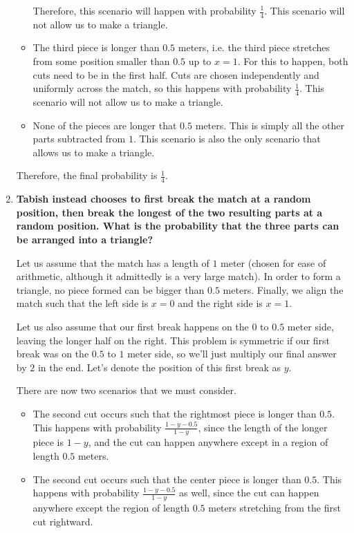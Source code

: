 \documentclass{article}
\begin{document}
\begin{enumerate}[label=(\alph*)]
\begin{itemize}
        Therefore, this scenario will happen with probability $\frac{1}{4}$. This scenario will not allow us to make a triangle.
        
        \item The third piece is longer than $0.5$ meters, i.e. the third piece stretches from some position smaller than $0.5$ up to $x = 1$. For this to happen, both cuts need to be in the first half. Cuts are chosen independently and uniformly across the match, so this happens with probability $\frac{1}{4}$. This scenario will not allow us to make a triangle.
        \item None of the pieces are longer that $0.5$ meters. This is simply all the other parts subtracted from $1$. This scenario is also the only scenario that allows us to make a triangle.
    \end{itemize}
    
    Therefore, the final probability is $\boxed{\frac{1}{4}}$.

    \vspace{2cm}
    
    \item \textbf{Tabish instead chooses to first break the match at a random position, then break the longest of the two resulting parts at a random position. What is the probability that the three parts can be arranged into a triangle?}
    
    Let us assume that the match has a length of $1$ meter (chosen for ease of arithmetic, although it admittedly is a very large match). In order to form a triangle, no piece formed can be bigger than $0.5$ meters. Finally, we align the match such that the left side is $x = 0$ and the right side is $x = 1$.
    
    Let us also assume that our first break happens on the $0$ to $0.5$ meter side, leaving the longer half on the right. This problem is symmetric if our first break was on the $0.5$ to $1$ meter side, so we'll just multiply our final answer by $2$ in the end. Let's denote the position of this first break as $y$.
    
    There are now two scenarios that we must consider.
    
    \begin{itemize}
        \item The second cut occurs such that the rightmost piece is longer than $0.5$. This happens with probability $\frac{1 - y - 0.5}{1 - y}$, since the length of the longer piece is $1 - y$, and the cut can happen anywhere except in a region of length $0.5$ meters.
        \item The second cut occurs such that the center piece is longer than $0.5$. This happens with probability $\frac{1 - y - 0.5}{1 - y}$ as well, since the cut can happen anywhere except the region of length $0.5$ meters stretching from the first cut rightward.
    \end{itemize}
    

\end{enumerate}
\end{document}
